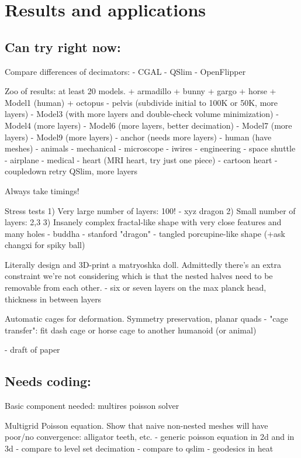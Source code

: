 
\section{Results and applications}
\label{sec:results}

\subsection{Can try right now:}

Compare differences of decimators:
  - CGAL
  - QSlim
  - OpenFlipper


Zoo of results: at least 20 models.
  + armadillo
  + bunny
  + gargo
  + horse
  + Model1 (human)
  + octopus
  - pelvis (subdivide initial to 100K or 50K, more layers)
  - Model3 (with more layers and double-check volume minimization)
  - Model4 (more layers)
  - Model6 (more layers, better decimation)
  - Model7 (more layers)
  - Model9 (more layers)
  - anchor (needs more layers)
  - human (have meshes)
  - animals
  - mechanical
    - microscope
    - iwires
  - engineering
    - space shuttle
    - airplane
  - medical
    - heart (MRI heart, try just one piece)
    - cartoon heart
  - coupledown retry QSlim, more layers

Always take timings!

Stress tests
  1) Very large number of layers: 100!
    - xyz dragon
  2) Small number of layers: 2,3
  3) Insanely complex fractal-like shape with very close features and many holes
    - buddha
    - stanford "dragon"
    - tangled porcupine-like shape (+ask changxi for spiky ball)

Literally design and 3D-print a matryoshka doll. Admittedly there's an extra
constraint we're not considering which is that the nested halves need to be
removable from each other.
  - six or seven layers on the max planck head, thickness in between layers

Automatic cages for deformation. Symmetry preservation, planar quads
  - "cage transfer": fit dash cage or horse cage to another humanoid (or
    animal)

- draft of paper

\subsection{Needs coding:}

Basic component needed: multires poisson solver

Multigrid Poisson equation. Show that naive non-nested meshes will have
poor/no convergence: alligator teeth, etc.
  - generic poisson equation in 2d and in 3d
    - compare to level set decimation
    - compare to qslim
  - geodesics in heat 

